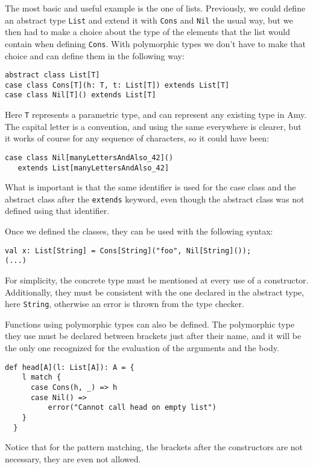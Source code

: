\newcommand{\code}[1]{\texttt{#1}}

The most basic and useful example is the one of lists. Previously, we could define an abstract type \code{List} and extend it with \code{Cons} and \code{Nil} the usual way, but we then had to make a choice about the type of the elements that the list would contain when defining \code{Cons}. With polymorphic types we don't have to make that choice and can define them in the following way:

\begin{lstlisting}
abstract class List[T]
case class Cons[T](h: T, t: List[T]) extends List[T]
case class Nil[T]() extends List[T]
\end{lstlisting}

Here \code{T} represents a parametric type, and can represent any existing type in Amy. The capital letter is a convention, and using the same everywhere is clearer, but it works of course for any sequence of characters, so it could have been:
\begin{lstlisting}
case class Nil[manyLettersAndAlso_42]()
   extends List[manyLettersAndAlso_42]
\end{lstlisting}

What is important is that the same identifier is used for the case class and the abstract class after the \code{extends} keyword, even though the abstract class was not defined using that identifier.

Once we defined the classes, they can be used with the following syntax:
\begin{lstlisting}
val x: List[String] = Cons[String]("foo", Nil[String]()); 
(...)
\end{lstlisting}

For simplicity, the concrete type must be mentioned at every use of a constructor. Additionally, they must be consistent with the one declared in the abstract type, here \code{String}, otherwise an error is thrown from the type checker.

Functions using polymorphic types can also be defined. The polymorphic type they use must be declared between brackets just after their name, and it will be the only one recognized for the evaluation of the arguments and the body. 
\begin{lstlisting}
def head[A](l: List[A]): A = {
    l match {
      case Cons(h, _) => h
      case Nil() => 
          error("Cannot call head on empty list")
    }
  }
\end{lstlisting}
Notice that for the pattern matching, the brackets after the constructors are not necessary, they are even not allowed.

